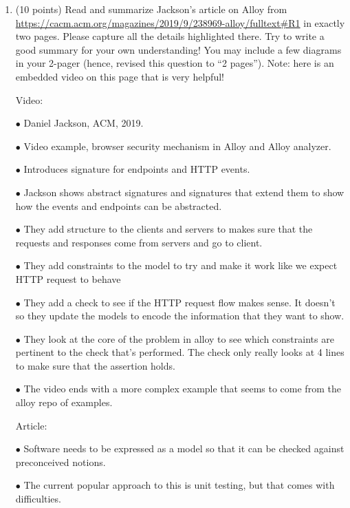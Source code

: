 \documentclass[11pt]{article}
\begin{document}
\begin{enumerate}

\item (10 points)
  Read and summarize Jackson's article on Alloy
  from \url{https://cacm.acm.org/magazines/2019/9/238969-alloy/fulltext#R1}
  in exactly two pages. Please capture all the details highlighted there.
  Try to write a good summary for your own understanding! You may include
  a few diagrams in your 2-pager (hence, revised this question to ``2 pages'').
  Note: here is an embedded video on this page that is very helpful!

  
      Video:
      
      $\bullet$ Daniel Jackson, ACM, 2019.
      
      $\bullet$ Video example, browser security mechanism in Alloy and Alloy analyzer.
      
      $\bullet$ Introduces signature for endpoints and HTTP events.
      
      $\bullet$ Jackson shows abstract signatures and signatures that extend them to show how the events and endpoints can be abstracted.
      
      $\bullet$ They add structure to the clients and servers to makes sure that the requests and responses come from servers and go to client.
      
      $\bullet$ They add constraints to the model to try and make it work like we expect HTTP request to behave
      
      $\bullet$ They add a check to see if the HTTP request flow makes sense. It doesn't so they update the models to encode the information that they want to show.
      
      $\bullet$ They look at the core of the problem in alloy to see which constraints are pertinent to the check that's performed. The check only really looks at 4 lines to make sure that the assertion holds.
      
      $\bullet$ The video ends with a more complex example that seems to come from the alloy repo of examples.
      
      Article:
      
      $\bullet$ Software needs to be expressed as a model so that it can be checked against preconceived notions.
      
      $\bullet$ The current popular approach to this is unit testing, but that comes with difficulties.
      

\end{enumerate}
\end{document}
